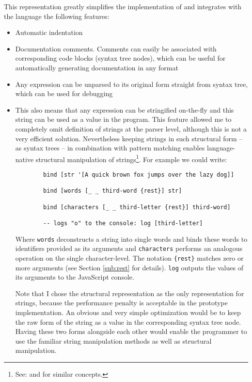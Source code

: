 This representation greatly simplifies the implementation of and integrates with
the language the following features:
\begin{itemize}
    \item Automatic indentation
    \item Documentation comments. Comments can easily be associated with
      corresponding code blocks (syntax tree nodes), which can be useful for
      automatically generating documentation in any format
    \item Any expression can be unparsed to its original form straight from
      syntax tree, which can be used for debugging
    \item This also means that any expression can be stringified on-the-fly and
      this string can be used as a value in the program. This feature allowed me
      to completely omit definition of strings at the parser level, although
      this is not a very efficient solution. Nevertheless keeping strings in
      such structural form -- as syntax trees -- in combination with pattern
      matching enables language-native structural manipulation of
      strings\footnote{See:
        \cite{wolfram_string_patterns}
        and
        \cite[Section~Pattern matching and strings]{pattern_matching_wikipedia}
        for similar concepts.}. For example
      we could write:
    \begin{lstlisting}
        bind [str '[A quick brown fox jumps over the lazy dog]]
                    
        bind [words [_ _ third-word {rest}] str]
        
        bind [characters [_ _ third-letter {rest}] third-word]
        
        -- logs "o" to the console: log [third-letter]
    \end{lstlisting}
    
Where \texttt{words} deconstructs a string into single words and binds these
words to identifiers provided as its arguments and \texttt{characters} performs
an analogous operation on the single character-level. The notation
\texttt{\{rest\}} matches zero or more arguments (see Section \ref{sub:rest} for
details). \texttt{log} outputs the values of its arguments to the JavaScript
console.

Note that I chose the structural representation as
the only representation for strings, because the performance penalty is acceptable in the prototype implementation. An obvious and very simple optimization
would be to keep the raw form of the string as a value in the
corresponding syntax tree node. Having these two forms alongside each
other would enable the programmer to use the familiar string
manipulation methods as well as structural manipulation.
\end{itemize}

